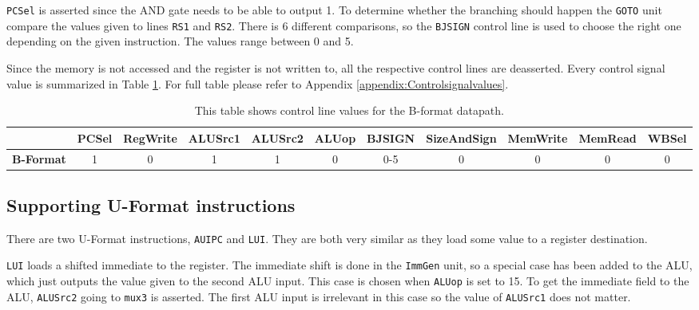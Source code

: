         \texttt{PCSel} is asserted since the AND gate needs to be able to output 1. To determine whether the branching should happen the \texttt{GOTO} unit compare the values given to lines \texttt{RS1} and \texttt{RS2}. There is 6 different comparisons, so the \texttt{BJSIGN} control line is used to choose the right one depending on the given instruction. The values range between 0 and 5.
        
        Since the memory is not accessed and the register is not written to, all the respective control lines are deasserted. Every control signal value is summarized in Table \ref{table:BFORMAT}. For full table please refer to Appendix \ref{appendix:Controlsignalvalues}.
        
        \begin{table}[h!]
            \small
            \hspace{-2.4cm}
            \begin{tabular}{|c||c|c|c|c|c|c|c|c|c|c|}
            	\hline
            	                  & \textbf{PCSel} & \textbf{RegWrite} & \textbf{ALUSrc1} & \textbf{ALUSrc2} & \textbf{ALUop} & \textbf{BJSIGN} & \textbf{SizeAndSign} & \textbf{MemWrite} & \textbf{MemRead} & \textbf{WBSel} \\ \hline\hline
            	\textbf{B-Format} &       1        &         0         &        1         &        1         &       0        &        0-5        &         0          &         0         &        0         &       0        \\ \hline
            \end{tabular}
            \caption{This table shows control line values for the B-format datapath.}
            \label{table:BFORMAT}
        \end{table}
    \subsection{Supporting U-Format instructions}
        There are two U-Format instructions, \texttt{AUIPC} and \texttt{LUI}. They are both very similar as they load some value to a register destination. 
        
        \texttt{LUI} loads a shifted immediate to the register. The immediate shift is done in the \texttt{ImmGen} unit, so a special case has been added to the ALU, which just outputs the value given to the second ALU input. This case is chosen when \texttt{ALUop} is set to 15. 
        To get the immediate field to the ALU, \texttt{ALUSrc2} going to \texttt{mux3} is asserted.
        The first ALU input is irrelevant in this case so the value of \texttt{ALUSrc1} does not matter. 
        
